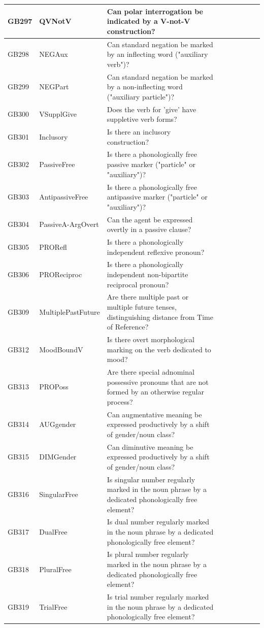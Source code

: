 \documentclass[draft,10pt]{article} %
\begin{document}
\begin{landscape}
\begin{longtable}{| l | p{4cm}| p{12cm}|p{2cm}|p{2cm}|p{2cm}|p{2cm}|p{2cm}|p{2cm}|}
GB297 & QVNotV&Can polar interrogation be indicated by a V-not-V construction?\\ \hline
GB298 & NEGAux&Can standard negation be marked by an inflecting word ("auxiliary verb")?\\ \hline
GB299 & NEGPart&Can standard negation be marked by a non-inflecting word ("auxiliary particle")?\\ \hline
GB300 & VSupplGive&Does the verb for 'give' have suppletive verb forms?\\ \hline
GB301 & Inclusory&Is there an inclusory construction?\\ \hline
GB302 & PassiveFree&Is there a phonologically free passive marker ("particle" or "auxiliary")?\\ \hline
GB303 & AntipassiveFree&Is there a phonologically free antipassive marker ("particle" or "auxiliary")?\\ \hline
GB304 & PassiveA-ArgOvert&Can the agent be expressed overtly in a passive clause?\\ \hline
GB305 & PRORefl&Is there a phonologically independent reflexive pronoun?\\ \hline
GB306 & PROReciproc&Is there a phonologically independent non-bipartite reciprocal pronoun?\\ \hline
GB309 & MultiplePastFuture&Are there multiple past or multiple future tenses, distinguishing distance from Time of Reference?\\ \hline
GB312 & MoodBoundV&Is there overt morphological marking on the verb dedicated to mood?\\ \hline
GB313 & PROPoss&Are there special adnominal possessive pronouns that are not formed by an otherwise regular process?\\ \hline
GB314 & AUGgender&Can augmentative meaning be expressed productively by a shift of gender/noun class?\\ \hline
GB315 & DIMGender&Can diminutive meaning be expressed productively by a shift of gender/noun class?\\ \hline
GB316 & SingularFree&Is singular number regularly marked in the noun phrase by a dedicated phonologically free element?\\ \hline
GB317 & DualFree&Is dual number regularly marked in the noun phrase by a dedicated phonologically free element?\\ \hline
GB318 & PluralFree&Is plural number regularly marked in the noun phrase by a dedicated phonologically free element?\\ \hline
GB319 & TrialFree&Is trial number regularly marked in the noun phrase by a dedicated phonologically free element?\\ \hline

\end{longtable}
\end{landscape}
\end{document}
